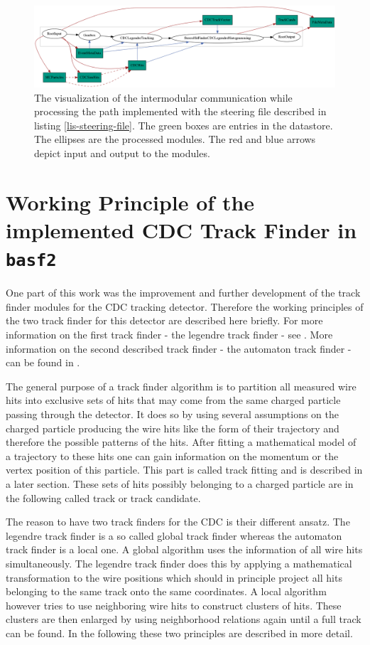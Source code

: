 \begin{figure}
 \centering
 \includegraphics[width=\linewidth]{figures/theory/dataflow.png}
 \caption{The visualization of the intermodular communication while processing the path implemented with the steering file described in listing \ref{lis-steering-file}. The green boxes are entries in the datastore. The ellipses are the processed modules. The red and blue arrows depict input and output to the modules.}
 \label{fig-viz-datastore}
\end{figure}


\section{Working Principle of the implemented CDC Track Finder in \texttt{basf2}}

One part of this work was the improvement and further development of the track finder modules for the CDC tracking detector. Therefore the working principles of the two track finder for this detector are described here briefly. For more information on the first track finder - the legendre track finder - see \cite{kronenbitter}. More information on the second described track finder - the automaton track finder - can be found in \cite{oliver}.

The general purpose of a track finder algorithm is to partition all measured wire hits into exclusive sets of hits that may come from the same charged particle passing through the detector. It does so by using several assumptions on the charged particle producing the wire hits like the form of their trajectory and therefore the possible patterns of the hits. After fitting a mathematical model of a trajectory to these hits one can gain information on the momentum or the vertex position of this particle. This part is called track fitting and is described in a later section. These sets of hits possibly belonging to a charged particle are in the following called track or track candidate.

The reason to have two track finders for the CDC is their different ansatz. The legendre track finder is a so called global track finder whereas the automaton track finder is a local one. A global algorithm uses the information of all wire hits simultaneously. The legendre track finder does this by applying a mathematical transformation to the wire positions which should in principle project all hits belonging to the same track onto the same coordinates. A local algorithm however tries to use neighboring wire hits to construct clusters of hits. These clusters are then enlarged by using neighborhood relations again until a full track can be found. In the following these two principles are described in more detail.

